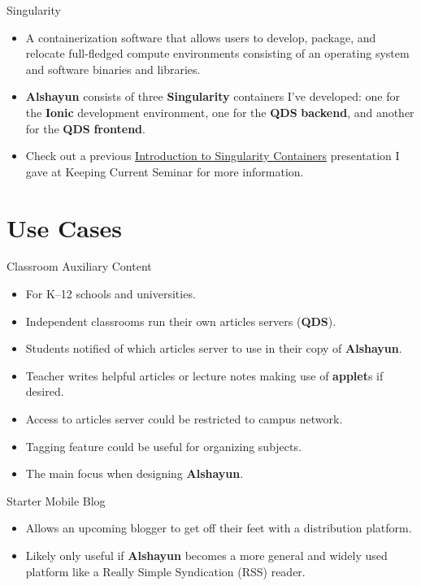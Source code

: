 \documentclass{beamer}
\begin{document}
\begin{frame}{Singularity}
    \begin{itemize}
        \item A containerization software that allows users to develop, package,
            and relocate full-fledged compute environments consisting of an
            operating system and software binaries and libraries.
        \item \textbf{Alshayun} consists of three \textbf{Singularity}
            containers I've developed: one for the \textbf{Ionic} development
            environment, one for the \textbf{QDS} \textbf{backend}, and another
            for the \textbf{QDS} \textbf{frontend}.
        \item Check out a previous
            \href{https://youtu.be/NeTRm7_JwX8}{Introduction to Singularity
            Containers} presentation I gave at Keeping Current Seminar for more
            information.
    \end{itemize}
\end{frame}

\section{Use Cases}

\begin{frame}{Classroom Auxiliary Content}
    \begin{itemize}
        \item For K--12 schools and universities.
        \item Independent classrooms run their own articles servers
            (\textbf{QDS}).
        \item Students notified of which articles server to use in their copy of
            \textbf{Alshayun}.
        \item Teacher writes helpful articles or lecture notes making use of
            \textbf{applet}s if desired.
        \item Access to articles server could be restricted to campus network.
        \item Tagging feature could be useful for organizing subjects.
        \item The main focus when designing \textbf{Alshayun}.
    \end{itemize}
\end{frame}

\begin{frame}{Starter Mobile Blog}
    \begin{itemize}
        \item Allows an upcoming blogger to get off their feet with a
            distribution platform.
        \item Likely only useful if \textbf{Alshayun} becomes a more general and
            widely used platform like a Really Simple Syndication (RSS) reader.
    \end{itemize}
\end{frame}
\end{document}
